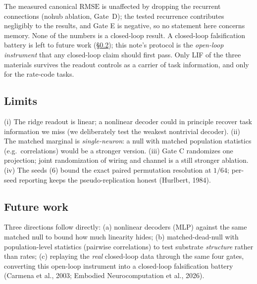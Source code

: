 \documentclass[12pt]{article}
\begin{document}
The measured canonical $\mathrm{RMSE}$ is unaffected by dropping the recurrent
connections (nohub ablation, Gate~D); the tested recurrence contributes
negligibly to the results, and Gate E is negative, so no statement here
concerns memory. None of the numbers is a closed-loop result. A
closed-loop falsification battery is left to future work
(\S\ref{sec:disc5}); this note's protocol is the \emph{open-loop
instrument} that any closed-loop claim should first pass. Only LIF of
the three materials survives the readout controls as a carrier of task
information, and only for the rate-code tasks.

\subsection{Limits}\label{sec:disc4}

(i) The ridge readout is linear; a nonlinear decoder could in
principle recover task information we miss (we deliberately test the
weakest nontrivial decoder). (ii) The matched marginal is
\emph{single-neuron}: a null with matched population statistics (e.g.\
correlations) would be a stronger version. (iii) Gate C randomizes one
projection; joint randomization of wiring and channel is a still
stronger ablation. (iv) The seeds ($6$) bound the exact paired
permutation resolution at $1/64$; per-seed reporting keeps the
pseudo-replication honest (Hurlbert, 1984).

\subsection{Future work}\label{sec:disc5}

Three directions follow directly: (a) nonlinear decoders (MLP) against
the same matched null to bound how much linearity hides;
(b) matched-dead-null with population-level statistics (pairwise
correlations) to test substrate \emph{structure} rather than rates;
(c) replaying the \emph{real} closed-loop data through the same four
gates, converting this open-loop instrument into a closed-loop
falsification battery (Carmena et al., 2003; Embodied Neurocomputation et al., 2026).
\end{document}
